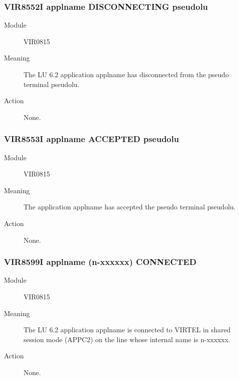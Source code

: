 \documentclass[letterpaper,10pt,english]{sphinxmanual}
\begin{document}
\subsubsection{VIR8552I applname DISCONNECTING pseudolu}
\label{\detokenize{messages:vir8552i-applname-disconnecting-pseudolu}}\begin{description}
\item[{Module}] \leavevmode
VIR0815

\item[{Meaning}] \leavevmode
The LU 6.2 application applname has disconnected from the pseudo terminal pseudolu.

\item[{Action}] \leavevmode
None.

\end{description}


\subsubsection{VIR8553I applname ACCEPTED pseudolu}
\label{\detokenize{messages:vir8553i-applname-accepted-pseudolu}}\begin{description}
\item[{Module}] \leavevmode
VIR0815

\item[{Meaning}] \leavevmode
The application applname has accepted the pseudo terminal pseudolu.

\item[{Action}] \leavevmode
None.

\end{description}


\subsubsection{VIR8599I applname (n-xxxxxx) CONNECTED}
\label{\detokenize{messages:vir8599i-applname-n-xxxxxx-connected}}\begin{description}
\item[{Module}] \leavevmode
VIR0815

\item[{Meaning}] \leavevmode
The LU 6.2 application applname is connected to VIRTEL in shared session mode (APPC2) on the line whose internal name is n-xxxxxx.

\item[{Action}] \leavevmode
None.

\end{description}
\end{document}
